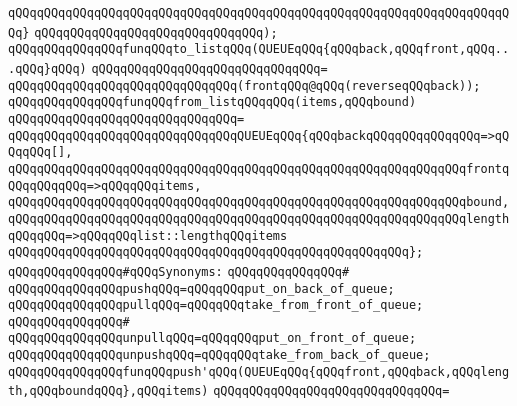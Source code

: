 \verb|qQQqqQQqqQQqqQQqqQQqqQQqqQQqqQQqqQQqqQQqqQQqqQQqqQQqqQQqqQQqqQQqqQQqqQQq}|\newline
\verb|qQQqqQQqqQQqqQQqqQQqqQQqqQQqqQQq);|\newline
\newline
\verb|qQQqqQQqqQQqqQQqfunqQQqto_listqQQq(QUEUEqQQq{qQQqback,qQQqfront,qQQq...qQQq}qQQq)|\newline
\verb|qQQqqQQqqQQqqQQqqQQqqQQqqQQqqQQq=|\newline
\verb|qQQqqQQqqQQqqQQqqQQqqQQqqQQqqQQq(frontqQQq@qQQq(reverseqQQqback));|\newline
\newline
\verb|qQQqqQQqqQQqqQQqfunqQQqfrom_listqQQqqQQq(items,qQQqbound)|\newline
\verb|qQQqqQQqqQQqqQQqqQQqqQQqqQQqqQQq=|\newline
\verb|qQQqqQQqqQQqqQQqqQQqqQQqqQQqqQQqQUEUEqQQq{qQQqbackqQQqqQQqqQQqqQQq=>qQQqqQQq[],|\newline
\verb|qQQqqQQqqQQqqQQqqQQqqQQqqQQqqQQqqQQqqQQqqQQqqQQqqQQqqQQqqQQqqQQqfrontqQQqqQQqqQQq=>qQQqqQQqitems,|\newline
\verb|qQQqqQQqqQQqqQQqqQQqqQQqqQQqqQQqqQQqqQQqqQQqqQQqqQQqqQQqqQQqqQQqbound,|\newline
\verb|qQQqqQQqqQQqqQQqqQQqqQQqqQQqqQQqqQQqqQQqqQQqqQQqqQQqqQQqqQQqqQQqlengthqQQqqQQq=>qQQqqQQqlist::lengthqQQqitems|\newline
\verb|qQQqqQQqqQQqqQQqqQQqqQQqqQQqqQQqqQQqqQQqqQQqqQQqqQQqqQQq};|\newline
\newline
\newline
\verb|qQQqqQQqqQQqqQQq#qQQqSynonyms:|\newline
\verb|qQQqqQQqqQQqqQQq#|\newline
\verb|qQQqqQQqqQQqqQQqpushqQQq=qQQqqQQqput_on_back_of_queue;|\newline
\verb|qQQqqQQqqQQqqQQqpullqQQq=qQQqqQQqtake_from_front_of_queue;|\newline
\verb|qQQqqQQqqQQqqQQq#|\newline
\verb|qQQqqQQqqQQqqQQqunpullqQQq=qQQqqQQqput_on_front_of_queue;|\newline
\verb|qQQqqQQqqQQqqQQqunpushqQQq=qQQqqQQqtake_from_back_of_queue;|\newline
\newline
\newline
\verb|qQQqqQQqqQQqqQQqfunqQQqpush'qQQq(QUEUEqQQq{qQQqfront,qQQqback,qQQqlength,qQQqboundqQQq},qQQqitems)|\newline
\verb|qQQqqQQqqQQqqQQqqQQqqQQqqQQqqQQq=|\newline
